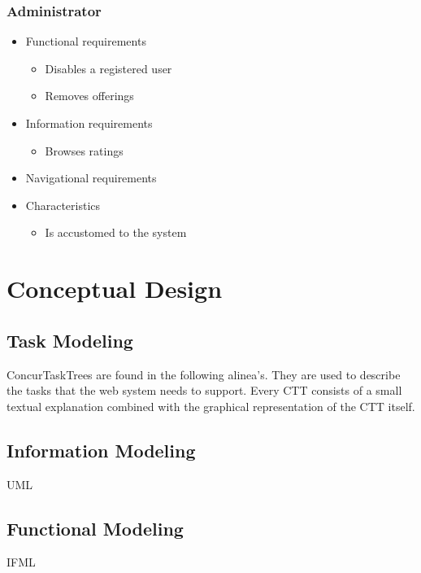 \documentclass[a4paper]{report}
\begin{document}
\subsection{Administrator}
\begin{itemize}
	\item Functional requirements
	\begin{itemize}
		\item Disables a registered user
		\item Removes offerings
	\end{itemize}
	\item Information requirements
	\begin{itemize}
		\item Browses ratings
	\end{itemize}
	\item Navigational requirements
	\item Characteristics
	\begin{itemize}
		\item Is accustomed to the system
	\end{itemize}
\end{itemize}















\chapter{Conceptual Design}
\section{Task Modeling}
ConcurTaskTrees are found in the following alinea's. They are used to describe the tasks that the web system needs to support. Every CTT consists of a small textual explanation combined with the graphical representation of the CTT itself.


\section{Information Modeling}
UML

\section{Functional Modeling}
IFML
\end{document}

